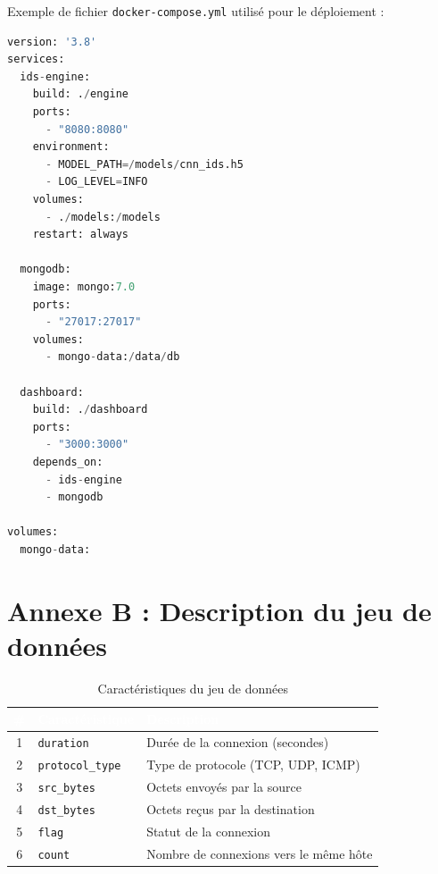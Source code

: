 \documentclass[12pt, a4paper, oneside]{report}
\begin{document}
Exemple de fichier \texttt{docker-compose.yml} utilisé pour le déploiement :

\begin{lstlisting}[language=Python, caption={Configuration Docker Compose}]
version: '3.8'
services:
  ids-engine:
    build: ./engine
    ports:
      - "8080:8080"
    environment:
      - MODEL_PATH=/models/cnn_ids.h5
      - LOG_LEVEL=INFO
    volumes:
      - ./models:/models
    restart: always

  mongodb:
    image: mongo:7.0
    ports:
      - "27017:27017"
    volumes:
      - mongo-data:/data/db

  dashboard:
    build: ./dashboard
    ports:
      - "3000:3000"
    depends_on:
      - ids-engine
      - mongodb

volumes:
  mongo-data:
\end{lstlisting}

\section*{Annexe B : Description du jeu de données}

\begin{table}[H]
  \centering
  \caption{Caractéristiques du jeu de données}
  \renewcommand{\arraystretch}{1.3}
  \small
  \begin{tabularx}{\textwidth}{|c|l|X|}
    \hline
    \rowcolor{iacsTableHead}
    \textcolor{white}{\textbf{\#}} &
    \textcolor{white}{\textbf{Caractéristique}} &
    \textcolor{white}{\textbf{Description}} \\
    \hline
    1 & \texttt{duration} & Durée de la connexion (secondes) \\
    \hline
    \rowcolor{iacsLightGray}
    2 & \texttt{protocol\_type} & Type de protocole (TCP, UDP, ICMP) \\
    \hline
    3 & \texttt{src\_bytes} & Octets envoyés par la source \\
    \hline
    \rowcolor{iacsLightGray}
    4 & \texttt{dst\_bytes} & Octets reçus par la destination \\
    \hline
    5 & \texttt{flag} & Statut de la connexion \\
    \hline
    \rowcolor{iacsLightGray}
    6 & \texttt{count} & Nombre de connexions vers le même hôte \\
    \hline
  \end{tabularx}
\end{table}
\end{document}
